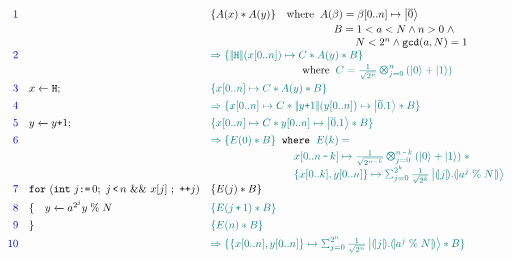 \begin{figure}[t]
{\small
\[\hspace*{-1em}
\begin{array}{r l  l}
\textcolor{blue}{1}
&&
\{A(x) * A(y) \}
\quad\text{where}\;\;
A(\beta) = \beta[0..n] \mapsto \ket{\overline{0}} 
\\[0.2em]
&&
\qquad\qquad\qquad
\qquad\qquad\quad
\begin{array}{l}
B = 1 < a < N \wedge n > 0 \;\wedge
\\\qquad N < 2^n \wedge \texttt{gcd}(a,N)=1
\end{array}
\\[0.5em]
\textcolor{blue}{2}
&
&
\textcolor{teal}{
\Rightarrow
\{\dabs{\ihadh}(x[0..n]) \mapsto C * A(y) * B \}
}
\\[0.2em]
&&
\qquad\qquad\qquad
\qquad\;\;
\text{where}
\;\;
\textcolor{teal}{
C = \shad{2^n}{n}{}
}
\\[0.5em]
\textcolor{blue}{3}
& \ssassign{x}{}{\ihadh};
&
\textcolor{teal}{
\{x[0..n] \mapsto C * A(y) * B \}
}
\\[0.4em]
\textcolor{blue}{4}
&
&
\textcolor{teal}{
\Rightarrow
\{x[0..n] \mapsto C * \dabs{y\splus 1}(y[0..n]) \mapsto \ket{\overline{0}.1} * B \}
}
\\[0.4em]
\textcolor{blue}{5}
& \ssassign{y}{}{y\splus 1};
&
\textcolor{teal}{
\{x[0..n] \mapsto C * y[0..n] \mapsto \ket{\overline{0}.1} * B \}
}
\\[0.4em]
\textcolor{blue}{6}
& 
&
\textcolor{teal}{
\Rightarrow
\{ E(0) * B \}
}
\;\;
\texttt{where}\;\;
\textcolor{teal}{E(k) =}
\\[0.2em]
&&
\qquad\qquad\quad\;
\qquad
\textcolor{teal}{
\begin{array}{l}
x[0..n\,\sminus\,k] \mapsto \shad{2^{n \,\sminus\,  k}}{n \,\sminus\, k}{}\;*
\\[0.2em]
\{x[0..k],y[0..n]\} \mapsto \sch{2^k}{\frac{1}{\sqrt{2^k}}}{\tos{j}.\tos{a^{j}\;\%\;N}}
\end{array}
}
\\[0.4em]
\textcolor{blue}{7}
&\sqforh{\sint{j}{0}}{j\,\slt\, n}{x[j]}{\dplus{j}}
&
\{E(j) * B \}
\\[0.4em]
\textcolor{blue}{8}
&
\{\quad  \ssassign{y}{}{a^{2^j}y\;\%\; N}
&
\textcolor{teal}{
\{E(j\,\splus\, 1) * B \}
}
\\[0.4em]
\textcolor{blue}{9}
&
\}
&
\textcolor{teal}{
\{E(n) * B \}
}
\\[0.4em]
\textcolor{blue}{10}
&
&
\textcolor{teal}{
\Rightarrow
\{\{x[0..n],y[0..n]\} \mapsto \sch{2^{n}}{\frac{1}{\sqrt{2^{n}}}}{\tos{j}.\tos{a^{j}\;\%\;N}} * B \}
}
\end{array}\]}
\end{figure}
